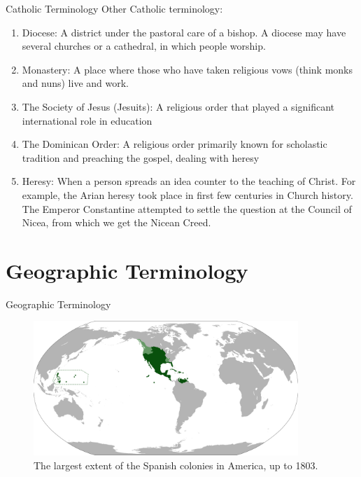 \documentclass{beamer}
\begin{document}
\begin{frame}{Catholic Terminology}
\small
Other Catholic terminology:
\begin{enumerate}
\item Diocese: A district under the pastoral care of a bishop.  A diocese may have several churches or a cathedral, in which people worship.
\item Monastery: A place where those who have taken religious vows (think monks and nuns) live and work.
\item The Society of Jesus (Jesuits): A religious order that played a significant international role in education
\item The Dominican Order: A religious order primarily known for scholastic tradition and preaching the gospel, dealing with heresy
\item Heresy: When a person spreads an idea counter to the teaching of Christ.  For example, the Arian heresy took place in first few centuries in Church history.  The Emperor Constantine attempted to settle the question at the Council of Nicea, from which we get the Nicean Creed.
\end{enumerate}
\end{frame}

\section{Geographic Terminology}

\begin{frame}{Geographic Terminology}
\begin{figure}
\centering
\includegraphics[width=10cm]{figures/vice.png}
\caption{The largest extent of the Spanish colonies in America, up to 1803.}
\end{figure}
\end{frame}
\end{document}
